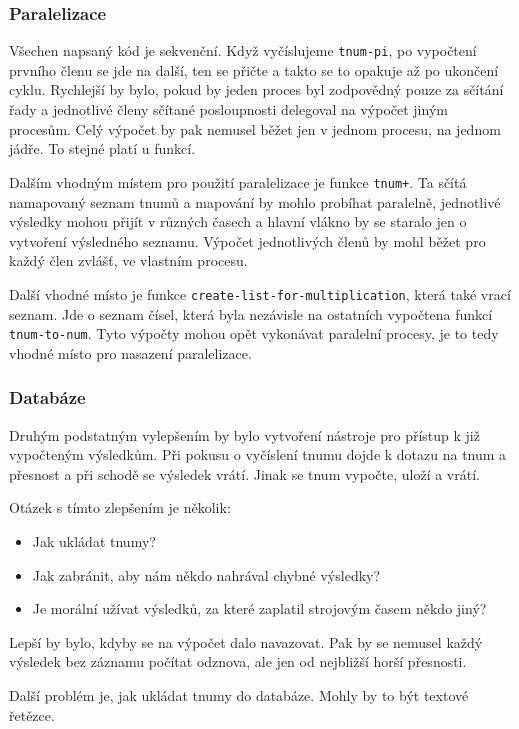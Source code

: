\subsubsection{Paralelizace}
Všechen napsaný kód je sekvenční. Když vyčíslujeme \texttt{tnum-pi}, po vypočtení prvního členu se jde na další, ten se přičte a takto se to opakuje až po ukončení cyklu. Rychlejší by bylo, pokud by jeden proces byl zodpovědný pouze za sčítání řady a jednotlivé členy sčítané posloupnosti delegoval na výpočet jiným procesům. Celý výpočet by pak nemusel běžet jen v jednom procesu, na jednom jádře. To stejné platí u funkcí.

Dalším vhodným místem pro použití paralelizace je funkce \texttt{tnum+}. Ta sčítá namapovaný seznam tnumů a mapování by mohlo probíhat paralelně, jednotlivé výsledky mohou přijít v různých časech a hlavní vlákno by se staralo jen o vytvoření výsledného seznamu. Výpočet jednotlivých členů by mohl běžet pro každý člen zvlášť, ve vlastním procesu.

Další vhodné místo je funkce \texttt{create-list-for-multiplication}, která také vrací seznam. Jde o seznam čísel, která byla nezávisle na ostatních vypočtena funkcí \texttt{tnum-to-num}. Tyto výpočty mohou opět vykonávat paralelní procesy, je to tedy vhodné místo pro nasazení paralelizace.

\subsubsection{Databáze}
Druhým podstatným vylepšením by bylo vytvoření nástroje pro přístup k již vypočteným výsledkům. Při pokusu o vyčíslení tnumu dojde k dotazu na tnum a přesnost a při schodě se výsledek vrátí. Jinak se tnum vypočte, uloží a vrátí.

Otázek s tímto zlepšením je několik:
\begin{itemize}
\item{Jak ukládat tnumy?}
\item{Jak zabránit, aby nám někdo nahrával chybné výsledky?}
\item{Je morální užívat výsledků, za které zaplatil strojovým časem někdo jiný?}
\end{itemize}

Lepší by bylo, kdyby se na výpočet dalo navazovat. Pak by se nemusel každý výsledek bez záznamu počítat odznova, ale jen od nejbližší horší přesnosti.

Další problém je, jak ukládat tnumy do databáze. Mohly by to být textové řetězce.

